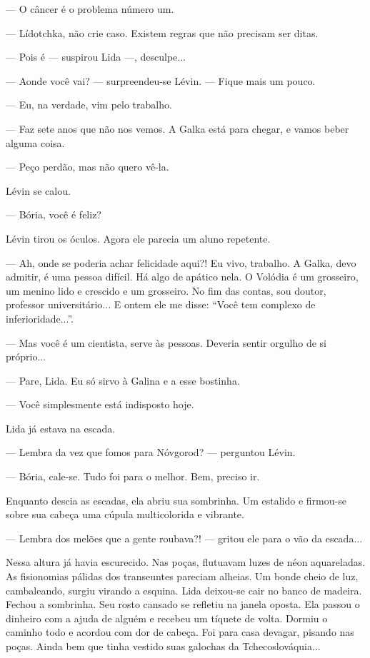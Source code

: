 --- O câncer é o problema número um.

--- Lídotchka, não crie caso. Existem regras que não precisam ser ditas.

--- Pois é --- suspirou Lida ---, desculpe...

--- Aonde você vai? --- surpreendeu-se Lévin. --- Fique mais um pouco.

--- Eu, na verdade, vim pelo trabalho.

--- Faz sete anos que não nos vemos. A Galka está para chegar, e vamos
beber alguma coisa.

--- Peço perdão, mas não quero vê-la.

Lévin se calou.

--- Bória, você é feliz?

Lévin tirou os óculos. Agora ele parecia um aluno repetente.

--- Ah, onde se poderia achar felicidade aqui?! Eu vivo, trabalho. A
Galka, devo admitir, é uma pessoa difícil. Há algo de apático nela. O
Volódia é um grosseiro, um menino lido e crescido e um grosseiro. No fim
das contas, sou doutor, professor universitário... E ontem ele me disse:
``Você tem complexo de inferioridade...''.

--- Mas você é um cientista, serve às pessoas. Deveria sentir orgulho de
si próprio...

--- Pare, Lida. Eu só sirvo à Galina e a esse bostinha.

--- Você simplesmente está indisposto hoje.

Lida já estava na escada.

--- Lembra da vez que fomos para Nóvgorod? --- perguntou Lévin.

--- Bória, cale-se. Tudo foi para o melhor. Bem, preciso ir.

Enquanto descia as escadas, ela abriu sua sombrinha. Um estalido e
firmou-se sobre sua cabeça uma cúpula multicolorida e vibrante.

--- Lembra dos melões que a gente roubava?! --- gritou ele para o vão da
escada...

Nessa altura já havia escurecido. Nas poças, flutuavam luzes de néon
aquareladas. As fisionomias pálidas dos transeuntes pareciam alheias. Um
bonde cheio de luz, cambaleando, surgiu virando a esquina. Lida
deixou-se cair no banco de madeira. Fechou a sombrinha. Seu rosto
cansado se refletiu na janela oposta. Ela passou o dinheiro com a ajuda
de alguém e recebeu um tíquete de volta. Dormiu o caminho todo e acordou
com dor de cabeça. Foi para casa devagar, pisando nas poças. Ainda bem
que tinha vestido suas galochas da Tchecoslováquia...

